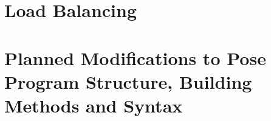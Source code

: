 \documentclass[10pt]{article}
\newcommand{\pose}{{\sc Pose}}
\begin{document}
\section{Load Balancing}

\section{Planned Modifications to \pose{} Program Structure, Building Methods and Syntax}

%
%
%
%
%
%
%

\end{document}
